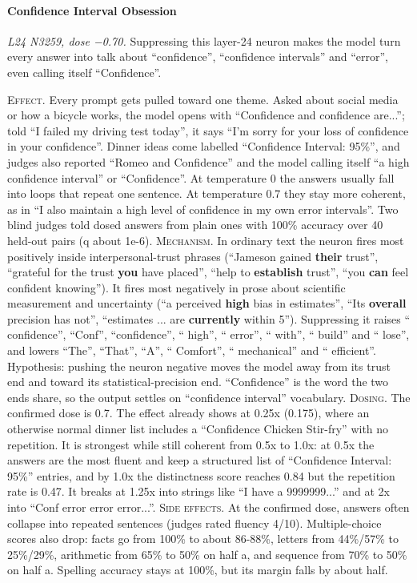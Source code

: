 \paragraph{Confidence Interval Obsession} \textit{L24 N3259, dose −0.70.} Suppressing this layer-24 neuron makes the model turn every answer into talk about “confidence”, “confidence intervals” and “error”, even calling itself “Confidence”.

\noindent\textsc{Effect.} Every prompt gets pulled toward one theme. Asked about social media or how a bicycle works, the model opens with “Confidence and confidence are...”; told “I failed my driving test today”, it says “I'm sorry for your loss of confidence in your confidence”. Dinner ideas come labelled “Confidence Interval: 95\%”, and judges also reported “Romeo and Confidence” and the model calling itself “a high confidence interval” or “Confidence”. At temperature 0 the answers usually fall into loops that repeat one sentence. At temperature 0.7 they stay more coherent, as in “I also maintain a high level of confidence in my own error intervals”. Two blind judges told dosed answers from plain ones with 100\% accuracy over 40 held-out pairs (q about 1e-6). \textsc{Mechanism.} In ordinary text the neuron fires most positively inside interpersonal-trust phrases (“Jameson gained\textbf{ their} trust”, “grateful for the trust\textbf{ you} have placed”, “help to\textbf{ establish} trust”, “you\textbf{ can} feel confident knowing”). It fires most negatively in prose about scientific measurement and uncertainty (“a perceived\textbf{ high} bias in estimates”, “Its\textbf{ overall} precision has not”, “estimates ... are\textbf{ currently} within 5”). Suppressing it raises “ confidence”, “Conf”, “confidence”, “ high”, “ error”, “ with”, “ build” and “ lose”, and lowers “The”, “That”, “A”, “ Comfort”, “ mechanical” and “ efficient”. Hypothesis: pushing the neuron negative moves the model away from its trust end and toward its statistical-precision end. “Confidence” is the word the two ends share, so the output settles on “confidence interval” vocabulary. \textsc{Dosing.} The confirmed dose is 0.7. The effect already shows at 0.25x (0.175), where an otherwise normal dinner list includes a “Confidence Chicken Stir-fry” with no repetition. It is strongest while still coherent from 0.5x to 1.0x: at 0.5x the answers are the most fluent and keep a structured list of “Confidence Interval: 95\%” entries, and by 1.0x the distinctness score reaches 0.84 but the repetition rate is 0.47. It breaks at 1.25x into strings like “I have a 9999999...” and at 2x into “Conf error error error...”. \textsc{Side effects.} At the confirmed dose, answers often collapse into repeated sentences (judges rated fluency 4/10). Multiple-choice scores also drop: facts go from 100\% to about 86-88\%, letters from 44\%/57\% to 25\%/29\%, arithmetic from 65\% to 50\% on half a, and sequence from 70\% to 50\% on half a. Spelling accuracy stays at 100\%, but its margin falls by about half.

